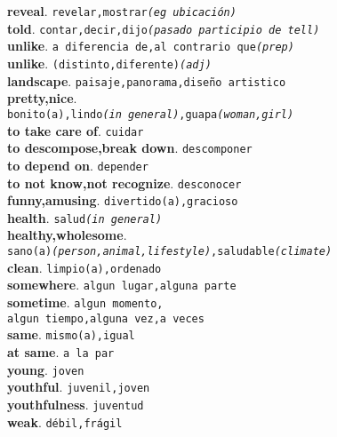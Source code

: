 \documentclass[twocolumn]{article}
\begin{document}
	\textsf{\textbf{reveal}}. \texttt{revelar,mostrar{\scriptsize \textsl{(eg ubicaci\'on)}}}\\
	\textsf{\textbf{told}}. \texttt{contar,decir,dijo{\scriptsize \textsl{(pasado participio de tell)}}}\\
	\textsf{\textbf{unlike}}. \texttt{a diferencia de,al contrario que{\scriptsize \textsl{(prep)}}}\\
	\textsf{\textbf{unlike}}. \texttt{(distinto,diferente){\scriptsize \textsl{(adj)}}}\\
	\textsf{\textbf{landscape}}. \texttt{paisaje,panorama,dise\~no artistico}\\
	\textsf{\textbf{pretty,nice}}.\\\texttt{bonito(a),lindo{\scriptsize \textsl{(in general)}},guapa{\scriptsize \textsl{(woman,girl)}}}\\
	\textsf{\textbf{to take care of}}. \texttt{cuidar}\\
	\textsf{\textbf{to descompose,break down}}. \texttt{descomponer}\\
	\textsf{\textbf{to depend on}}. \texttt{depender}\\
	\textsf{\textbf{to not know,not recognize}}. \texttt{desconocer}\\
	\textsf{\textbf{funny,amusing}}. \texttt{divertido(a),gracioso}\\
	\textsf{\textbf{health}}. \texttt{salud{\scriptsize \textsl{(in general)}}}\\
	\textsf{\textbf{healthy,wholesome}}.\\
			  \texttt{sano(a){\scriptsize \textsl{(person,animal,lifestyle)}},saludable{\scriptsize \textsl{(climate)}}}\\
   \textsf{\textbf{clean}}. \texttt{limpio(a),ordenado}\\
	\textsf{\textbf{somewhere}}. \texttt{algun lugar,alguna parte}\\
	\textsf{\textbf{sometime}}. \texttt{algun momento,\\algun tiempo,alguna vez,a veces}\\
	\textsf{\textbf{same}}. \texttt{mismo(a),igual}\\
	\textsf{\textbf{at same}}. \texttt{a la par}\\
	\textsf{\textbf{young}}. \texttt{joven}\\
	\textsf{\textbf{youthful}}. \texttt{juvenil,joven}\\
	\textsf{\textbf{youthfulness}}. \texttt{juventud}\\
	\textsf{\textbf{weak}}. \texttt{d\'ebil,fr\'agil}\\
\end{document}
